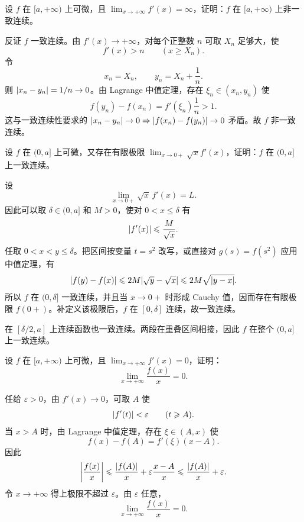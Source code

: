 \begin{xreferenceproblem}[12]
设 $f$ 在 $[a,+\infty)$ 上可微，且 $\lim_{x\to+\infty}f'(x)=\infty$，证明：$f$ 在 $[a,+\infty)$ 上非一致连续。
\end{xreferenceproblem}
\begin{xsolution}
反证 $f$ 一致连续。由 $f'(x)\to+\infty$，对每个正整数 $n$ 可取 $X_n$ 足够大，使
\[
  f'(x)>n\qquad(x\geqslant X_n).
\]
令
\[
  x_n=X_n,
  \qquad
  y_n=X_n+\frac1n.
\]
则 $\lvert x_n-y_n\rvert=1/n\to0$。由 Lagrange 中值定理，存在 $\xi_n\in(x_n,y_n)$ 使
\[
  f(y_n)-f(x_n)=f'(\xi_n)\frac1n>1.
\]
这与一致连续性要求的 $\lvert x_n-y_n\rvert\to0\Rightarrow\lvert f(x_n)-f(y_n)\rvert\to0$ 矛盾。故 $f$ 非一致连续。
\end{xsolution}


\begin{xreferenceproblem}[13]
设 $f$ 在 $(0,a]$ 上可微，又存在有限极限 $\lim_{x\to0+}\sqrt{x}f'(x)$，证明：$f$ 在 $(0,a]$ 上一致连续。
\end{xreferenceproblem}
\begin{xsolution}
设
\[
  \lim_{x\to0+}\sqrt{x}\,f'(x)=L.
\]
因此可以取 $\delta\in(0,a]$ 和 $M>0$，使对 $0<x\leqslant\delta$ 有
\[
  \lvert f'(x)\rvert\leqslant\frac{M}{\sqrt{x}}.
\]
任取 $0<x<y\leqslant\delta$。把区间按变量 $t=s^2$ 改写，或直接对 $g(s)=f(s^2)$ 应用中值定理，有
\[
  \lvert f(y)-f(x)\rvert
  \leqslant2M\lvert\sqrt y-\sqrt x\rvert
  \leqslant2M\sqrt{\lvert y-x\rvert}.
\]
所以 $f$ 在 $(0,\delta]$ 一致连续，并且当 $x\to0+$ 时形成 Cauchy 值，因而存在有限极限 $f(0+)$。补定义该极限后，$f$ 在 $[0,\delta]$ 连续，故一致连续。

在 $[\delta/2,a]$ 上连续函数也一致连续。两段在重叠区间相接，因此 $f$ 在整个 $(0,a]$ 上一致连续。
\end{xsolution}


\begin{xreferenceproblem}[14]
设 $f$ 在 $[a,+\infty)$ 上可微，且 $\lim_{x\to+\infty}f'(x)=0$，证明：
\[
  \lim_{x\to+\infty}\frac{f(x)}{x}=0.
\]
\end{xreferenceproblem}
\begin{xsolution}
任给 $\varepsilon>0$，由 $f'(x)\to0$，可取 $A$ 使
\[
  \lvert f'(t)\rvert<\varepsilon\qquad(t\geqslant A).
\]
当 $x>A$ 时，由 Lagrange 中值定理，存在 $\xi\in(A,x)$ 使
\[
  f(x)-f(A)=f'(\xi)(x-A).
\]
因此
\[
  \left|\frac{f(x)}x\right|
  \leqslant\frac{\lvert f(A)\rvert}x
   +\varepsilon\frac{x-A}{x}
  \leqslant\frac{\lvert f(A)\rvert}x+\varepsilon.
\]
令 $x\to+\infty$ 得上极限不超过 $\varepsilon$。由 $\varepsilon$ 任意，
\[
  \lim_{x\to+\infty}\frac{f(x)}x=0.
\]
\end{xsolution}


